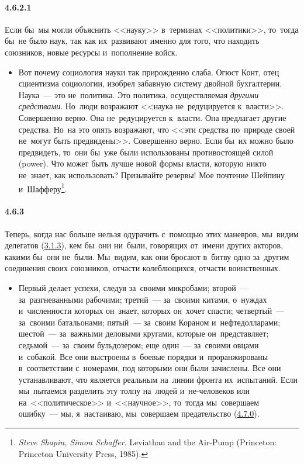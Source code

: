 \paragraph{4.6.2.1}\hypertarget{par:4.6.2.1}{} Если бы~мы могли объяснить <<науку>> в~терминах <<политики>>, то~тогда бы~не было наук, так как их~развивают именно для того, что находить союзников, новые ресурсы и~пополнение войск. 
	\begin{itemize}
	\item 
	Вот почему социология науки так прирожденно слаба. Огюст Конт, отец сциентизма социологии, изобрел забавную систему двойной бухгалтерии. Наука~--- это не~политика. Это политика, осуществляемая {\itshape другими средствами}. Но~люди возражают <<наука не~редуцируется к~власти>>. Совершенно верно. Она не~редуцируется к~власти. Она предлагает другие средства. Но~на это опять возражают, что <<эти средства по~природе своей не~могут быть предвидены>>. Совершенно верно. Если бы~их можно было предвидеть, то~они бы~уже были использованы противостоящей силой (power). Что может быть лучше новой формы власти, которую никто не~знает, как использовать? Призывайте резервы! Мое почтение Шейпину и~Шафферу\footnote{{\itshape Steve Shapin, Simon Schaffer}. Leviathan and the Air-Pump (Prince­ton: Princeton University Press, 1985).}.
	\end{itemize}	

\paragraph{4.6.3}\hypertarget{par:4.6.3}{} Теперь, когда нас больше нельзя одурачить с~помощью этих маневров, мы~видим делегатов (\hyperlink{par:3.1.3}{3.1.3}), кем бы~они ни~были, говорящих от~имени других акторов, какими бы~они не~были. Мы~видим, как они бросают в~битву одно за~другим соединения своих союзников, отчасти колеблющихся, отчасти воинственных. 

	\begin{itemize}
	\item 
	Первый делает успехи, следуя за~своими микробами; второй~--- за~разгневанными рабочими; третий~--- за~своими китами, о~нуждах и~численности которых он~знает, которых он~хочет спасти; четвертый~--- за~своими батальонами; пятый~--- за~своим Кораном и~нефтедолларами; шестой~--- за~важными деловыми кругами, которые он~представляет; седьмой~--- за~своим бульдозером; еще один~--- за~своими овцами и~собакой. Все они выстроены в~боевые порядки и~проранжированы в~соответствии с~номерами, под которыми они были зачислены. Все они устанавливают, что является реальным на~линии фронта их~испытаний. Если мы~пытаемся разделить эту толпу на~людей и~не-человеков или на~<<политическое>> и~<<научное>>, то~тогда мы~совершаем ошибку~--- мы, я~настаиваю, мы~совершаем предательство (\hyperlink{par:4.7.0}{4.7.0}).
	\end{itemize}	

